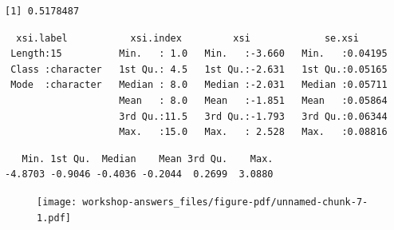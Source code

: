 \documentclass[
  letterpaper,
  DIV=11,
  numbers=noendperiod]{scrreprt}
\newenvironment{Shaded}{\begin{snugshade}}{\end{snugshade}}
\newcommand{\AttributeTok}[1]{\textcolor[rgb]{0.40,0.45,0.13}{#1}}
\newcommand{\CommentTok}[1]{\textcolor[rgb]{0.37,0.37,0.37}{#1}}
\newcommand{\FunctionTok}[1]{\textcolor[rgb]{0.28,0.35,0.67}{#1}}
\newcommand{\NormalTok}[1]{\textcolor[rgb]{0.00,0.23,0.31}{#1}}
\newcommand{\SpecialCharTok}[1]{\textcolor[rgb]{0.37,0.37,0.37}{#1}}
\begin{document}
\begin{verbatim}
[1] 0.5178487
\end{verbatim}

\begin{Shaded}
\end{Shaded}

\begin{verbatim}
  xsi.label           xsi.index         xsi             se.xsi       
 Length:15          Min.   : 1.0   Min.   :-3.660   Min.   :0.04195  
 Class :character   1st Qu.: 4.5   1st Qu.:-2.631   1st Qu.:0.05165  
 Mode  :character   Median : 8.0   Median :-2.031   Median :0.05711  
                    Mean   : 8.0   Mean   :-1.851   Mean   :0.05864  
                    3rd Qu.:11.5   3rd Qu.:-1.793   3rd Qu.:0.06344  
                    Max.   :15.0   Max.   : 2.528   Max.   :0.08816  
\end{verbatim}

\begin{Shaded}
\end{Shaded}

\begin{verbatim}
   Min. 1st Qu.  Median    Mean 3rd Qu.    Max. 
-4.8703 -0.9046 -0.4036 -0.2044  0.2699  3.0880 
\end{verbatim}

\begin{Shaded}
\end{Shaded}

\begin{figure}[H]

{\centering \texttt{[image: workshop-answers\_files/figure-pdf/unnamed-chunk-7-1.pdf]}

}

\end{figure}
\end{document}
